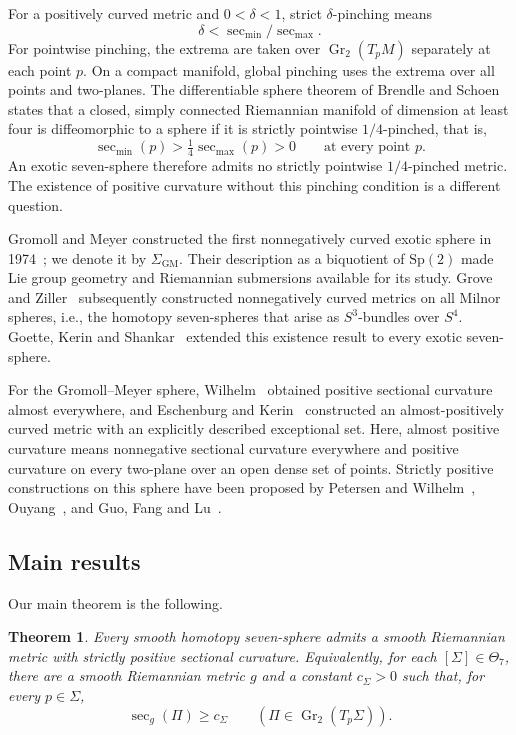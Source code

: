 \documentclass[12pt]{amsart}
\numberwithin{equation}{section}
\newtheorem{theorem}{Theorem}[section]
\theoremstyle{remark}
\newcommand{\Gr}{\operatorname{Gr}}
\newcommand{\Ksec}{\operatorname{sec}}
\begin{document}
For a positively curved metric and \(0<\delta<1\), strict
\(\delta\)-pinching means
\[
\delta<\Ksec_{\min}/\Ksec_{\max}.
\]
For pointwise pinching, the extrema are taken over \(\Gr_2(T_pM)\)
separately at each point \(p\). On a compact manifold, global pinching
uses the extrema over all points and two-planes. The differentiable
sphere theorem of Brendle and Schoen~\cite{BS} states that a closed,
simply connected Riemannian manifold of dimension at least four is
diffeomorphic to a sphere if it is strictly pointwise \(1/4\)-pinched,
that is,
\[
 \Ksec_{\min}(p)>\tfrac14\Ksec_{\max}(p)>0
 \qquad\text{at every point }p.
\]
An exotic seven-sphere therefore admits no strictly pointwise
\(1/4\)-pinched metric. The existence of positive curvature without
this pinching condition is a different question.

Gromoll and Meyer constructed the first nonnegatively curved exotic
sphere in 1974~\cite{GM}; we denote it by \(\Sigma_{\mathrm{GM}}\). Their description as a biquotient of
\(\mathrm{Sp}(2)\) made Lie group geometry and Riemannian submersions
available for its study. Grove and Ziller~\cite{GZ} subsequently
constructed nonnegatively curved metrics on all Milnor spheres, i.e., the
homotopy seven-spheres that arise as \(S^3\)-bundles over \(S^4\).
Goette, Kerin and Shankar~\cite{GKS} extended this existence result
to every exotic seven-sphere.

For the Gromoll--Meyer sphere, Wilhelm~\cite{Wilhelm} obtained positive
sectional curvature almost everywhere, and Eschenburg and
Kerin~\cite{EK} constructed an almost-positively curved metric with an
explicitly described exceptional set. Here, almost positive curvature
means nonnegative sectional curvature everywhere and positive curvature
on every two-plane over an open dense set of points. Strictly positive
constructions on this sphere have been proposed by Petersen and Wilhelm~\cite{PW}, Ouyang~\cite{Ouyang}, and Guo, Fang and Lu~\cite{GFL}.

\subsection{Main results}
Our main theorem is the following.

\begin{theorem}\label{thm:main}
Every smooth homotopy seven-sphere admits a smooth Riemannian metric
with strictly positive sectional curvature. Equivalently, for each
\([\Sigma]\in\Theta_7\), there are a smooth Riemannian metric \(g\)
and a constant \(c_\Sigma>0\) such that, for every \(p\in\Sigma\),
\begin{equation}\label{eq:main-lower-bound}
 \Ksec_g(\Pi)\ge c_\Sigma
 \qquad(\Pi\in\Gr_2(T_p\Sigma)).
\end{equation}
\end{theorem}
\end{document}
